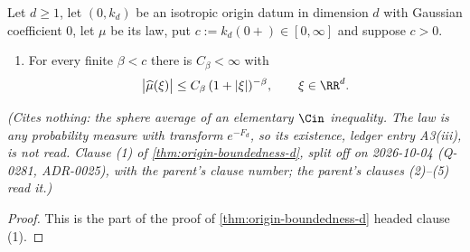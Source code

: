\begin{lemma}
\label{lem:origin-decay-exponent}
\leanok
Let $d \ge 1$, let $(0, k_d)$ be an isotropic origin datum in dimension $d$ with Gaussian
coefficient $0$, let $\mu$ be its law, put $c := k_d(0{+}) \in [0,\infty]$ and suppose $c > 0$.
\begin{enumerate}
\item[(1)] For every finite $\beta < c$ there is $C_\beta < \infty$ with
\[
  \bigl|\widehat\mu(\xi)\bigr| \le C_\beta\,(1+|\xi|)^{-\beta}, \qquad \xi \in \RR^d .
\]
\end{enumerate}
\statusT\quad\emph{(Cites nothing: the sphere average of an elementary $\Cin$ inequality. The law is
any probability measure with transform $e^{-F_d}$, so its existence, ledger entry A3(iii), is not
read.
Clause (1) of \ref{thm:origin-boundedness-d}, split off on 2026-10-04 (Q-0281, ADR-0025), with the
parent's clause number; the parent's clauses (2)--(5) read it.)}
\end{lemma}

\begin{proof}
\leanok
This is the part of the proof of \ref{thm:origin-boundedness-d} headed clause (1).
\end{proof}

